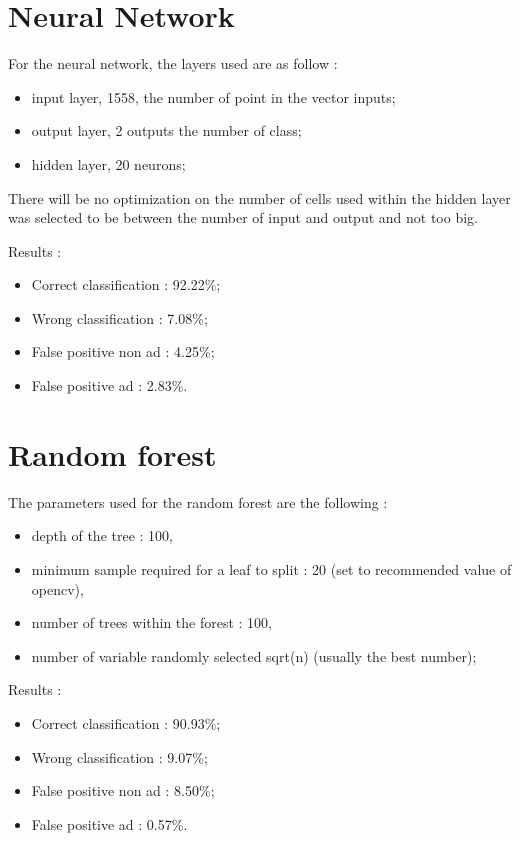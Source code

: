 \section{Neural Network}
For the neural network, the layers used are as follow :
  \begin{itemize}
    \item input layer, 1558, the number of point in the vector inputs;
    \item output layer, 2 outputs the number of class;
    \item hidden layer, 20 neurons;
  \end{itemize}
  There will be no optimization on the number of cells used within the hidden layer was selected to be between the number of input and output and not too big.

  Results :
  \begin{itemize}
    \item Correct classification : 92.22\%;
    \item Wrong classification : 7.08\%;
    \item False positive non ad : 4.25\%;
    \item False positive ad : 2.83\%.
  \end{itemize}


\section{Random forest}
The parameters used for the random forest are the following :
  \begin{itemize}
      \item depth of the tree : 100,
      \item minimum sample required for a leaf to split : 20 (set to recommended value of opencv),
      \item number of trees within the forest : 100,
      \item number of variable randomly selected sqrt(n) (usually the best number);
  \end{itemize}

Results :
\begin{itemize}
  \item Correct classification : 90.93\%;
  \item Wrong classification : 9.07\%;
  \item False positive non ad : 8.50\%;
  \item False positive ad : 0.57\%.
\end{itemize}
